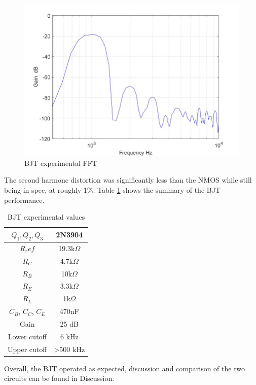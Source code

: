 \begin{figure}[H]
	\centering
	\includegraphics[width=0.7\linewidth]{ExperimentalImplementation/bjt_fft.jpg}
	\caption{BJT experimental FFT}
	\label{fig:bjtexpfft}
\end{figure}

The second harmonc distortion was significantly less than the NMOS while still being in spec, at roughly 1\%. Table \ref{tab:bjtexp} shows the summary of the BJT performance.




\begin{table}[H]
	\centering
	\caption{BJT experimental values}
	\label{tab:bjtexp}
	\begin{tabular}{|c|c|}
		$Q_1, Q_2, Q_3$ & 2N3904        \\ \hline
		$R_ref$         & 19.3k$\Omega$ \\ \hline
		$R_C$           & 4.7k$\Omega$  \\ \hline
		$R_B$           & 10k$\Omega$   \\ \hline 
		$R_E$           & 3.3k$\Omega$  \\ \hline 
		$R_L$           & 1k$\Omega$    \\ \hline
		$C_B$, $C_C$, $C_E$ & 470nF     \\ \hline
		Gain           & 25 dB          \\ \hline
		Lower cutoff   & 6 kHz          \\ \hline
		Upper cutoff   &  >500 kHz      \\ \hline
	\end{tabular}
\end{table}

Overall, the BJT operated as expected, discussion and comparison of the two circuits can be found in Discussion.


%



